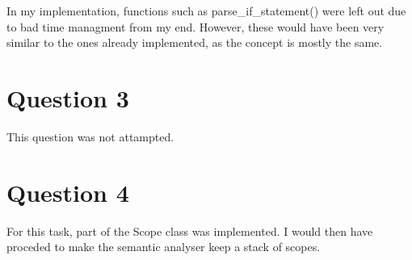 \documentclass[a4paper, 12pt]{article}
\begin{document}
In my implementation, functions such as parse\_if\_statement() were left out due to bad time managment from my end. However,
these would have been very similar to the ones  already implemented, as the concept is mostly the same.

\section{Question 3}
This question was not attampted.

\section{Question 4}
For this task, part of the Scope class was implemented. I would then have proceded to make the semantic analyser keep a stack of
scopes.
\end{document}
